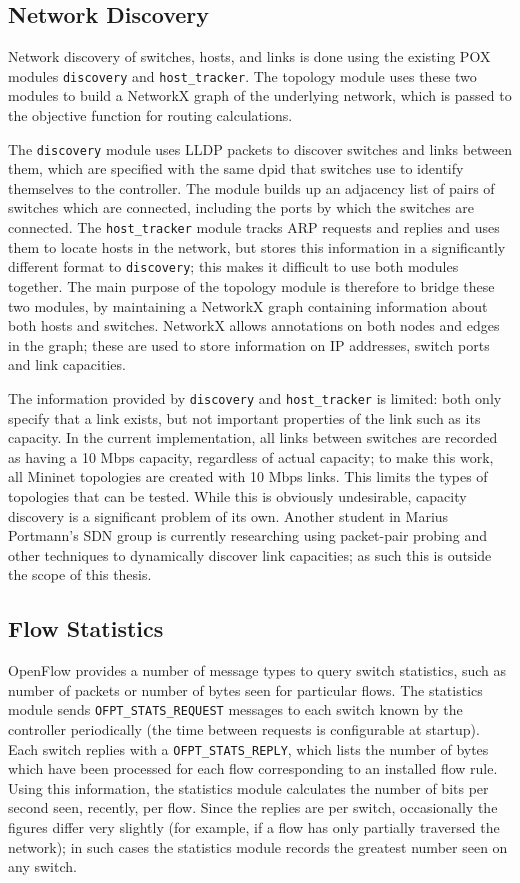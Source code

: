 \subsection{Network Discovery}
\label{sec:nd}
Network discovery of switches, hosts, and links is done using the existing POX modules \texttt{discovery} and \texttt{host\_tracker}. The topology module uses these two modules to build a NetworkX graph of the underlying network, which is passed to the objective function for routing calculations.

The \texttt{discovery} module uses LLDP packets to discover switches and links between them, which are specified with the same dpid that switches use to identify themselves to the controller. The module builds up an adjacency list of pairs of switches which are connected, including the ports by which the switches are connected. The \texttt{host\_tracker} module tracks ARP requests and replies and uses them to locate hosts in the network, but stores this information in a significantly different format to \texttt{discovery}; this makes it difficult to use both modules together. The main purpose of the topology module is therefore to bridge these two modules, by maintaining a NetworkX graph containing information about both hosts and switches. NetworkX allows annotations on both nodes and edges in the graph; these are used to store information on IP addresses, switch ports and link capacities.

The information provided by \texttt{discovery} and \texttt{host\_tracker} is limited: both only specify that a link exists, but not important properties of the link such as its capacity. In the current implementation, all links between switches are recorded as having a 10 Mbps capacity, regardless of actual capacity; to make this work, all Mininet topologies are created with 10 Mbps links. This limits the types of topologies that can be tested. While this is obviously undesirable, capacity discovery is a significant problem of its own. Another student in Marius Portmann's SDN group is currently researching using packet-pair probing and other techniques to dynamically discover link capacities; as such this is outside the scope of this thesis. 

\subsection{Flow Statistics}
OpenFlow provides a number of message types to query switch statistics, such as number of packets or number of bytes seen for particular flows. The statistics module sends \texttt{OFPT\_STATS\_REQUEST} messages to each switch known by the controller periodically (the time between requests is configurable at startup). Each switch replies with a \texttt{OFPT\_STATS\_REPLY}, which lists the number of bytes which have been processed for each flow corresponding to an installed flow rule. Using this information, the statistics module calculates the number of bits per second seen, recently, per flow. Since the replies are per switch, occasionally the figures differ very slightly (for example, if a flow has only partially traversed the network); in such cases the statistics module records the greatest number seen on any switch.

